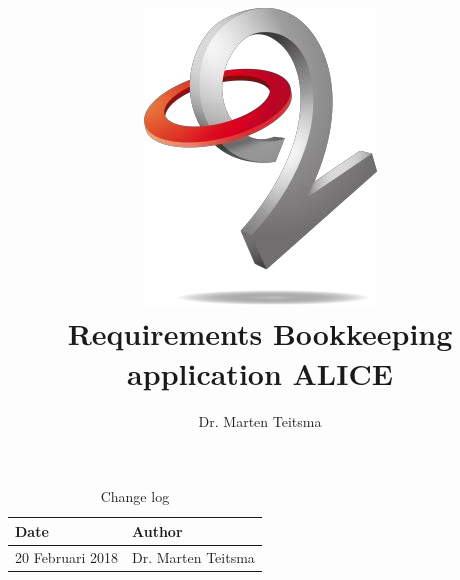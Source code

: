 \documentclass[a4paper,11pt]{book}
\title{\includegraphics{o2.png}\\Requirements Bookkeeping application ALICE}
\author{Dr. Marten Teitsma}
\begin{document}
\maketitle

\begin{table}
\begin{tabular}{p{6cm}p{6cm}}
\hline
Date  & Author\\
\hline
\hline
20 Februari 2018   & Dr. Marten Teitsma\\
\hline
\end{tabular}
\caption{Change log}
\end{table}


\tableofcontents




\end{document}
